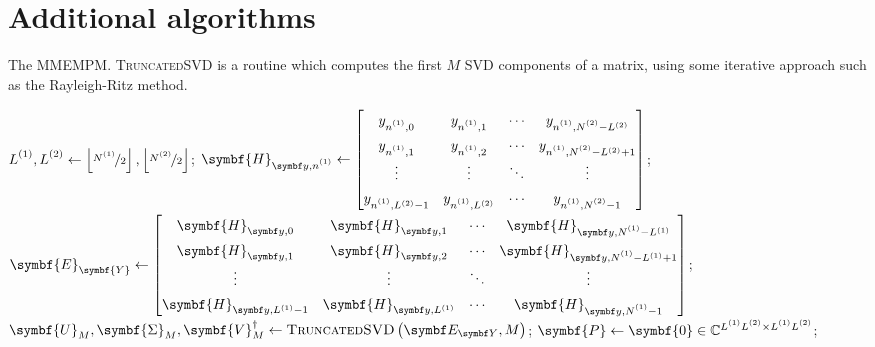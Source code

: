 \clearpage
\section{Additional algorithms}
\label{sec:algs}
\begin{algorithm}[h!]
    \caption[
        The \acl{MMEMPM}.
    ]{
        The \acs{MMEMPM}. \textsc{TruncatedSVD} is a routine which computes the
        first $M$ \ac{SVD} components of a matrix, using some iterative
        approach such as the Rayleigh-Ritz method.
    }
    \label{alg:mmempm}
    \begin{algorithmic}[1]
        \State $\Lone, \Ltwo \gets \left\lfloor \nicefrac{\None}{2} \right\rfloor, \left\lfloor \nicefrac{\Ntwo}{2} \right\rfloor$;
            \State  $\symbf{H}_{\by,\none} \gets
                \def\arraystretch{1.4}
            \begin{bmatrix}
                y_{\none, 0} &
                y_{\none, 1} &
                \cdots &
                y_{\none, \Ntwo-L^{(2)}}\\
                y_{\none, 1} &
                y_{\none, 2} &
                \cdots &
                y_{\none, \Ntwo-L^{(2)}+1}\\
                \vdots & \vdots & \ddots & \vdots\\
                y_{\none, L^{(2)} - 1} &
                y_{\none, L^{(2)}} &
                \cdots &
                y_{\none, \Ntwo-1}
            \end{bmatrix}
        $;
        \EndFor
        \State $\symbf{E}_{\symbf{Y}} \gets
        \begin{bmatrix}
            \symbf{H}_{\by,0} & \symbf{H}_{\by,1} & \cdots & \symbf{H}_{\by,\None - L^{(1)}}\\
            \symbf{H}_{\by,1} & \symbf{H}_{\by,2} & \cdots & \symbf{H}_{\by,\None - L^{(1)} + 1}\\
            \vdots & \vdots & \ddots & \vdots\\
            \symbf{H}_{\by,L^{(1)} - 1} & \symbf{H}_{\by,L^{(1)}} & \cdots & \symbf{H}_{\by,\None - 1}
        \end{bmatrix}
        $;
        \State $\symbf{U}_M^{\vphantom{\dagger}},
            \symbf{\Sigma}_M^{\vphantom{\dagger}},
            \symbf{V}_M^{\dagger} \gets
            \textsc{TruncatedSVD}\left(\EY, M\right)$;
        \State $\symbf{P} \gets \symbf{0} \in \mathbb{C}^{\Lone \Ltwo \times \Lone \Ltwo}$;

\end{algorithmic}
\end{algorithm}

